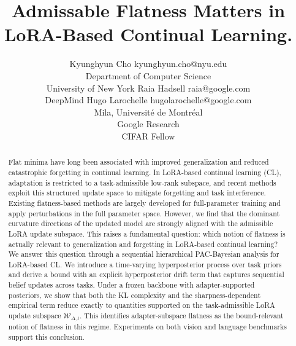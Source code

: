 \documentclass[10pt]{article} %
\title{Admissable Flatness Matters in LoRA-Based Continual Learning.}
\author{\name Kyunghyun Cho \email kyunghyun.cho@nyu.edu \\
      \addr Department of Computer Science\\
      University of New York
      \AND
      \name Raia Hadsell \email raia@google.com \\
      \addr DeepMind
      \AND
      \name Hugo Larochelle \email hugolarochelle@google.com\\
      \addr Mila, Universit\'e de Montr\'eal \\
      Google Research\\
      CIFAR Fellow}
\begin{document}
\maketitle

\begin{abstract}




Flat minima have long been associated with improved generalization and reduced catastrophic forgetting in continual learning. In LoRA-based continual learning (CL), adaptation is restricted to a task-admissible low-rank subspace, and recent methods exploit this structured update space to mitigate forgetting and task interference. Existing flatness-based methods are largely developed for full-parameter training and apply perturbations in the full parameter space. However, we find that the dominant curvature directions of the updated model are strongly aligned with the admissible LoRA update subspace. This raises a fundamental question: which notion of flatness is actually relevant to generalization and forgetting in LoRA-based continual learning? We answer this question through a sequential hierarchical PAC-Bayesian analysis for LoRA-based CL.
We introduce a time-varying hyperposterior process over task priors and derive a bound with an explicit hyperposterior drift term that captures sequential belief updates across tasks.
Under a frozen backbone with adapter-supported posteriors, we show that both the KL complexity and the sharpness-dependent empirical term reduce exactly to quantities supported on the task-admissible LoRA update subspace $\mathcal{W}_{\Delta,t}$.
This identifies adapter-subspace flatness as the bound-relevant notion of flatness in this regime. Experiments on both vision and language benchmarks support this conclusion.






\end{abstract}
\end{document}
